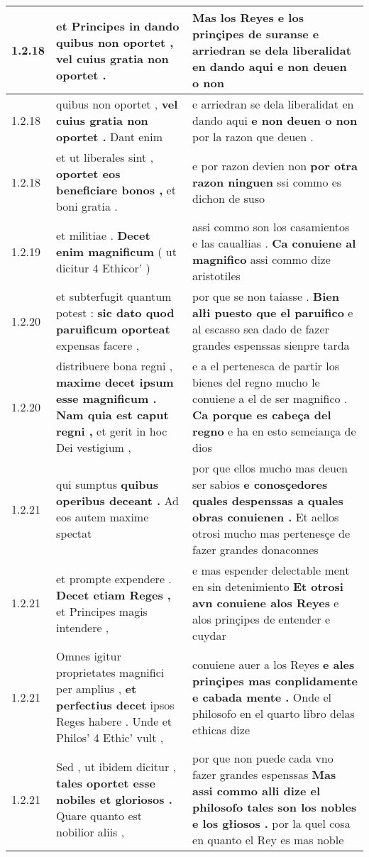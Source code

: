 \begin{tabular}{|p{1cm}|p{6.5cm}|p{6.5cm}|}
1.2.18 & et Principes in dando \textbf{ quibus non oportet , } vel cuius gratia non oportet . & Mas los Reyes e los prinçipes de suranse \textbf{ e arriedran se dela liberalidat en dando aqui } e non deuen o non \\\hline
1.2.18 & quibus non oportet , \textbf{ vel cuius gratia non oportet . } Dant enim & e arriedran se dela liberalidat en dando aqui \textbf{ e non deuen o non } por la razon que deuen . \\\hline
1.2.18 & et ut liberales sint , \textbf{ oportet eos beneficiare bonos , } et boni gratia . & e por razon devien non \textbf{ por otra razon ninguen } ssi commo es dichon de suso \\\hline
1.2.19 & et militiae . \textbf{ Decet enim magnificum } ( ut dicitur 4 Ethicor’ ) & assi commo son los casamientos e las caualłias . \textbf{ Ca conuiene al magnifico } assi commo dize aristotiles \\\hline
1.2.20 & et subterfugit quantum potest : \textbf{ sic dato quod paruificum oporteat } expensas facere , & por que se non taiasse . \textbf{ Bien alłi puesto que el paruifico } e al escasso sea dado de fazer grandes espenssas sienpre tarda \\\hline
1.2.20 & distribuere bona regni , \textbf{ maxime decet ipsum esse magnificum . Nam quia est caput regni , } et gerit in hoc Dei vestigium , & e a el pertenesca de partir los bienes del regno mucho le conuiene a el de ser magnifico . \textbf{ Ca porque es cabeça del regno } e ha en esto semeiança de dios \\\hline
1.2.21 & qui sumptus \textbf{ quibus operibus deceant . } Ad eos autem maxime spectat & por que ellos mucho mas deuen ser sabios \textbf{ e conosçedores quales despenssas a quales obras conuienen . } Et aellos otrosi mucho mas pertenesçe de fazer grandes donaconnes \\\hline
1.2.21 & et prompte expendere . \textbf{ Decet etiam Reges , } et Principes magis intendere , & e mas espender delectable ment en sin detenimiento \textbf{ Et otrosi avn conuiene alos Reyes } e alos prinçipes de entender e cuydar \\\hline
1.2.21 & Omnes igitur proprietates magnifici per amplius , \textbf{ et perfectius decet } ipsos Reges habere . Unde et Philos’ 4 Ethic’ vult , & conuiene auer a los Reyes \textbf{ e ales prinçipes mas conplidamente e cabada mente . } Onde el philosofo en el quarto libro delas ethicas dize \\\hline
1.2.21 & Sed , ut ibidem dicitur , \textbf{ tales oportet esse nobiles et gloriosos . } Quare quanto est nobilior aliis , & por que non puede cada vno fazer grandes espenssas \textbf{ Mas assi commo alli dize el philosofo tales son los nobles e los głiosos . } por la quel cosa en quanto el Rey es mas noble \\\hline

\end{tabular}
